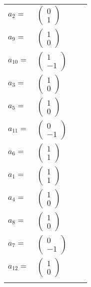 \documentclass[1p]{elsarticle_modified}
\theoremstyle{definition}
\begin{document}
\begin{tabular}{m{7pt} m{180pt} m{7pt} m{180pt} }
\flushright $a_{2}=$&$\begin{pmatrix}0\\1\end{pmatrix}$ \\
\flushright $a_{9}=$&$\begin{pmatrix}1\\0\end{pmatrix}$ \\
\flushright $a_{10}=$&$\begin{pmatrix}1\\-1\end{pmatrix}$ \\
\flushright $a_{3}=$&$\begin{pmatrix}1\\0\end{pmatrix}$ \\
\flushright $a_{5}=$&$\begin{pmatrix}1\\0\end{pmatrix}$ \\
\flushright $a_{11}=$&$\begin{pmatrix}0\\-1\end{pmatrix}$ \\
\flushright $a_{6}=$&$\begin{pmatrix}1\\1\end{pmatrix}$ \\
\flushright $a_{1}=$&$\begin{pmatrix}1\\1\end{pmatrix}$ \\
\flushright $a_{4}=$&$\begin{pmatrix}1\\0\end{pmatrix}$ \\
\flushright $a_{8}=$&$\begin{pmatrix}1\\0\end{pmatrix}$ \\
\flushright $a_{7}=$&$\begin{pmatrix}0\\-1\end{pmatrix}$ \\
\flushright $a_{12}=$&$\begin{pmatrix}1\\0\end{pmatrix}$\\&\end{tabular}
\end{document}
